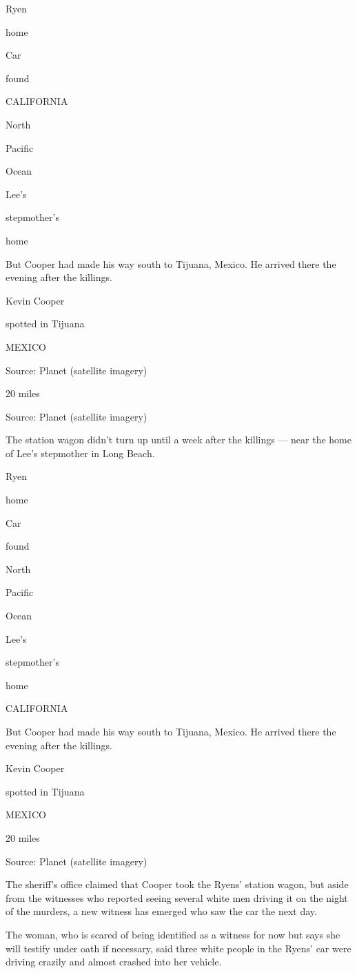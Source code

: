 Ryen

home

Car

found

CALIFORNIA

North

Pacific

Ocean

Lee's

stepmother's

home

But Cooper had made his way south to Tijuana, Mexico. He arrived there
the evening after the killings.

Kevin Cooper

spotted in Tijuana

MEXICO

Source: Planet (satellite imagery)

20 miles

Source: Planet (satellite imagery)

The station wagon didn't turn up until a week after the killings ---
near the home of Lee's stepmother in Long Beach.

Ryen

home

Car

found

North

Pacific

Ocean

Lee's

stepmother's

home

CALIFORNIA

But Cooper had made his way south to Tijuana, Mexico. He arrived there
the evening after the killings.

Kevin Cooper

spotted in Tijuana

MEXICO

20 miles

Source: Planet (satellite imagery)

The sheriff's office claimed that Cooper took the Ryens' station wagon,
but aside from the witnesses who reported seeing several white men
driving it on the night of the murders, a new witness has emerged who
saw the car the next day.

The woman, who is scared of being identified as a witness for now but
says she will testify under oath if necessary, said three white people
in the Ryens' car were driving crazily and almost crashed into her
vehicle.


